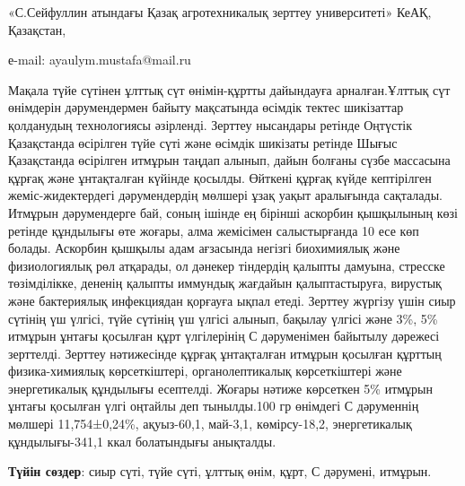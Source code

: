 \begin{affil}
«С.Сейфуллин атындағы Қазақ агротехникалық зерттеу университеті» КеАҚ, Қазақстан,

е-mail: ayaulym.mustafa@mail.ru
\end{affil}

Мақала түйе сүтінен ұлттық сүт өнімін-құртты дайындауға арналған.Ұлттық
сүт өнімдерін дәрумендермен байыту мақсатында өсімдік тектес шикізаттар
қолданудың технологиясы әзірленді. Зерттеу нысандары ретінде Оңтүстік
Қазақстанда өсірілген түйе сүті және өсімдік шикізаты ретінде Шығыс
Қазақстанда өсірілген итмұрын таңдап алынып, дайын болғаны сүзбе
массасына құрғақ және ұнтақталған күйінде қосылды. Өйткені құрғақ күйде
кептірілген жеміс-жидектердегі дәрумендердің мөлшері ұзақ уақыт
аралығында сақталады. Итмұрын дәрумендерге бай, соның ішінде ең бірінші
аскорбин қышқылының көзі ретінде құндылығы өте жоғары, алма жемісімен
салыстырғанда 10 есе көп болады. Аскорбин қышқылы адам ағзасында негізгі
биохимиялық және физиологиялық рөл атқарады, ол дәнекер тіндердің
қалыпты дамуына, стресске төзімділікке, дененің қалыпты иммундық
жағдайын қалыптастыруға, вирустық және бактериялық инфекциядан қорғауға
ықпал етеді. Зерттеу жүргізу үшін сиыр сүтінің үш үлгісі, түйе сүтінің
үш үлгісі алынып, бақылау үлгісі және 3\%, 5\% итмұрын ұнтағы қосылған
құрт үлгілерінің С дәруменімен байытылу дәрежесі зерттелді. Зерттеу
нәтижесінде құрғақ ұнтақталған итмұрын қосылған құрттың физика-химиялық
көрсеткіштері, органолептикалық көрсеткіштері және энергетикалық
құндылығы есептелді. Жоғары нәтиже көрсеткен 5\% итмұрын ұнтағы қосылған
үлгі оңтайлы деп тынылды.100 гр өнімдегі С дәруменнің мөлшері
11,754±0,24\%, ақуыз-60,1, май-3,1, көмірсу-18,2, энергетикалық
құндылығы-341,1 ккал болатындығы анықталды.

{\bfseries Түйін сөздер}: сиыр сүті, түйе сүті, ұлттық өнім, құрт, С
дәрумені, итмұрын.

